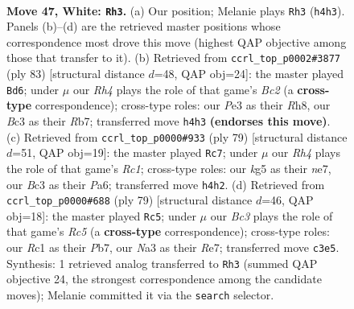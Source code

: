 \documentclass[11pt]{article}
\begin{document}
\clearpage

\begin{figure}[p]\centering
\begin{subfigure}{0.46\textwidth}\centering
\resizebox{\linewidth}{!}{%
\newchessgame
\chessboard[
  setfen={r7/pn6/1pr1p2p/5pk1/2P4R/N1B1PP2/P5P1/2R2K2 w - - 1 47},
  showmover=false,
  pgfstyle=straightmove, color=movearrow, markmove={h4-h3}
]}
\caption{}
\end{subfigure}\hfill
\begin{subfigure}{0.46\textwidth}\centering
\resizebox{\linewidth}{!}{%
\newchessgame
\chessboard[
  setfen={7r/1rb3p1/8/2pk3p/P2p1P2/1P2R1PK/3R3P/2N5 b - - 5 42},
  showmover=false,
  pgfstyle=straightmove, color=movearrow, markmove={c7-d6}
]}
\caption{}
\end{subfigure}
\\[4pt]
\begin{subfigure}{0.46\textwidth}\centering
\resizebox{\linewidth}{!}{%
\newchessgame
\chessboard[
  setfen={2r5/4N3/pp1p2pk/5p2/P1nP4/2R1P3/R3KP2/7r b - - 1 40},
  showmover=false,
  pgfstyle=straightmove, color=movearrow, markmove={c8-c7}
]}
\caption{}
\end{subfigure}\hfill
\begin{subfigure}{0.46\textwidth}\centering
\resizebox{\linewidth}{!}{%
\newchessgame
\chessboard[
  setfen={8/1pk1r1pB/3n3p/p3p2P/P1r3P1/R4PK1/2P1R3/8 b - - 5 40},
  showmover=false,
  pgfstyle=straightmove, color=movearrow, markmove={c4-c5}
]}
\caption{}
\end{subfigure}
\caption{\textbf{Move 47, White: \texttt{Rh3}.} (a) Our position; Melanie plays \texttt{Rh3} (\texttt{h4h3}). Panels (b)--(d) are the retrieved master positions whose correspondence most drove this move (highest QAP objective among those that transfer to it). (b) Retrieved from \texttt{ccrl\_top\_p0002\#3877} (ply 83) [structural distance $d$=48, QAP obj=24]: the master played \texttt{Bd6}; under $\mu$ our \emph{Rh4} plays the role of that game's \emph{Bc2} (a \textbf{cross-type} correspondence); cross-type roles: our \emph{P}e3 as their \emph{R}h8, our \emph{B}c3 as their \emph{R}b7; transferred move \texttt{h4h3} \textbf{(endorses this move)}. (c) Retrieved from \texttt{ccrl\_top\_p0000\#933} (ply 79) [structural distance $d$=51, QAP obj=19]: the master played \texttt{Rc7}; under $\mu$ our \emph{Rh4} plays the role of that game's \emph{Rc1}; cross-type roles: our \emph{k}g5 as their \emph{n}e7, our \emph{B}c3 as their \emph{P}a6; transferred move \texttt{h4h2}. (d) Retrieved from \texttt{ccrl\_top\_p0000\#688} (ply 79) [structural distance $d$=46, QAP obj=18]: the master played \texttt{Rc5}; under $\mu$ our \emph{Bc3} plays the role of that game's \emph{Rc5} (a \textbf{cross-type} correspondence); cross-type roles: our \emph{R}c1 as their \emph{P}b7, our \emph{N}a3 as their \emph{R}e7; transferred move \texttt{c3e5}. Synthesis: 1 retrieved analog transferred to \texttt{Rh3} (summed QAP objective 24, the strongest correspondence among the candidate moves); Melanie committed it via the \texttt{search} selector.}
\label{fig:thought-m92}
\end{figure}
\end{document}
